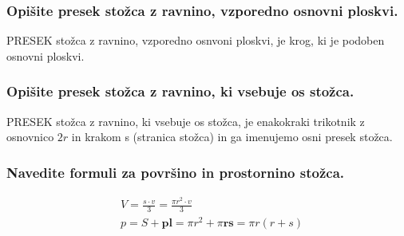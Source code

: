 \documentclass{article}
\begin{document}

\subsubsection*{Opišite presek stožca z ravnino, vzporedno osnovni ploskvi.}

PRESEK stožca z ravnino, vzporedno osnvoni ploskvi, je krog, ki je podoben osnovni ploskvi.

\subsubsection*{Opišite presek stožca z ravnino, ki vsebuje os stožca.}

PRESEK stožca z ravnino, ki vsebuje os stožca, je enakokraki trikotnik z osnovnico $2 r$ in krakom s (stranica stožca) in ga imenujemo osni presek stožca.

\subsubsection*{Navedite formuli za površino in prostornino stožca.}

$$
\begin{aligned}
& V=\frac{s \cdot v}{3}=\frac{\pi r^{2} \cdot v}{3} \\
& p=S+\mathbf{p l}=\pi r^{2}+\pi \mathbf{r s}=\pi r(r+s)
\end{aligned}
$$
\end{document}
